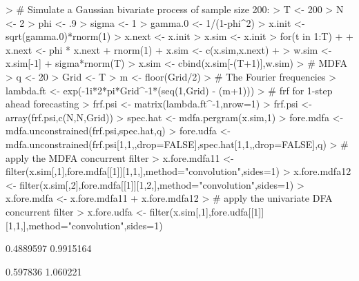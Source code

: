 \documentclass[a4paper]{book}
\begin{document}
\begin{Schunk}
\begin{Sinput}
> # Simulate a Gaussian bivariate process of sample size 200:
> T <- 200
> N <- 2
> phi <- .9
> sigma <- 1
> gamma.0 <- 1/(1-phi^2)
> x.init <- sqrt(gamma.0)*rnorm(1)
> x.next <- x.init
> x.sim <- x.init
> for(t in 1:T)
+ {
+ 	x.next <- phi * x.next + rnorm(1)
+ 	x.sim <- c(x.sim,x.next)
+ }
> w.sim <- x.sim[-1] + sigma*rnorm(T)
> x.sim <- cbind(x.sim[-(T+1)],w.sim)
> # MDFA
> q <- 20
> Grid <- T
> m <- floor(Grid/2)
> # The Fourier frequencies
> lambda.ft <- exp(-1i*2*pi*Grid^{-1}*(seq(1,Grid) - (m+1)))
> # frf for 1-step ahead forecasting
> frf.psi <- matrix(lambda.ft^{-1},nrow=1) %
> frf.psi <- array(frf.psi,c(N,N,Grid))
> spec.hat <- mdfa.pergram(x.sim,1)	
> fore.mdfa <- mdfa.unconstrained(frf.psi,spec.hat,q)
> fore.udfa <- mdfa.unconstrained(frf.psi[1,1,,drop=FALSE],spec.hat[1,1,,drop=FALSE],q)
> # apply the MDFA concurrent filter
> x.fore.mdfa11 <- filter(x.sim[,1],fore.mdfa[[1]][1,1,],method="convolution",sides=1)
> x.fore.mdfa12 <- filter(x.sim[,2],fore.mdfa[[1]][1,2,],method="convolution",sides=1)
> x.fore.mdfa <- x.fore.mdfa11 + x.fore.mdfa12 
> # apply the univariate DFA concurrent filter
> x.fore.udfa <- filter(x.sim[,1],fore.udfa[[1]][1,1,],method="convolution",sides=1)
\end{Sinput}
\end{Schunk}


\begin{Schunk}
\begin{Soutput}
[1] 0.4889597 0.9915164
\end{Soutput}
\begin{Soutput}
[1] 0.597836 1.060221
\end{Soutput}
\end{Schunk}
\end{document}
